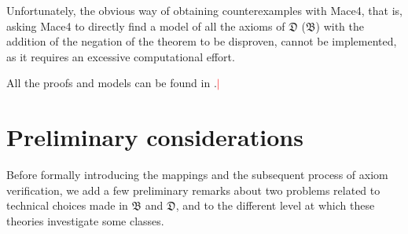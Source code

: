 \documentclass[ao]{iosart2x}
\newcommand{\nb}[1]{\textcolor{red}{$|$}\marginpar{\hspace*{-0cm}\parbox{20mm}{\scriptsize\raggedright\textcolor{red}{#1}}}}
\newcommand{\dolce}{{\textsc{dolce}}}
\newcommand{\bfo}{{\textsc{bfo}}}
\newcommand {\thdolce} {\ensuremath{\mathfrak{D}}}
\newcommand {\thbfo} {\ensuremath{\mathfrak{B}}}
\newcommand{\bfoiof}[1]{{\,::_{#1\:\!}}}
\begin{document}
Unfortunately, the obvious way of obtaining counterexamples with Mace4, that is, asking Mace4 to directly find a model of all the axioms of {$\thdolce$} ($\thbfo$) with the addition of the negation of the theorem to be disproven, cannot be implemented, as it requires an excessive computational effort.

%



All the proofs and models can be found in \cite{??}.\nb{CM: mettere documento, il del o un rapporto}

\section{Preliminary considerations}\label{sect_prelim_considerations}
Before formally introducing the mappings and the subsequent process of axiom verification, we add a few preliminary remarks about two problems related to technical choices made in {$\thbfo$} and {{$\thdolce$}}, and to the different level at which these theories investigate some classes. 



\end{document}
